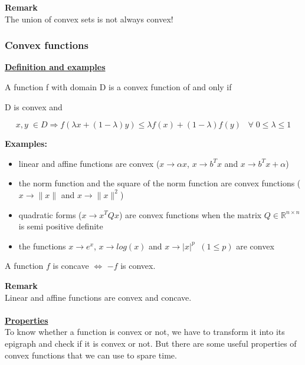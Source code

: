 \textbf{Remark}\\
The union of convex sets is not always convex! 
\\

\subsubsection{Convex functions}
\underline{\textbf{Definition and examples}}
\begin{mydef}
A function f with domain D is a convex function of and only if \\
\begin{center}
D is convex and 
\end{center}
$$x,y\; \in D \Rightarrow f(\lambda x+(1-\lambda)y) \le \lambda f(x)+(1-\lambda)f(y) \;\;\; \forall \; 0\le \lambda \le 1$$
\end{mydef}

\textbf{Examples:}
\begin{itemize}
\item linear and affine functions are convex ($x \rightarrow \alpha x$,  $x\rightarrow b^Tx$  and  $x \rightarrow b^Tx+\alpha$)
\item the norm function and the square of the norm function are convex functions ($x \rightarrow \|x\|$ and $x \rightarrow \|x\|^2$)
\item quadratic forms ($x \rightarrow x^TQx$) are convex functions when the matrix $Q \in \mathbb{R}^{n\times n}$ is semi positive definite
\item the functions $x \rightarrow e^x$,  $x\rightarrow log(x)$ and $x \rightarrow |x|^p \;\;(1 \le p)$ are convex
\end{itemize}


\begin{mydef}
A function $f$ is concave $\Leftrightarrow$ $-f$ is convex.
\end{mydef}

\textbf{Remark}\\
Linear and affine functions are convex and concave. 
\\
\\

\underline{\textbf{Properties}}\\

To know whether a function is convex or not, we have to transform it into its epigraph and check if it is convex or not. But there are some useful properties of convex functions that we can use to spare time. 

